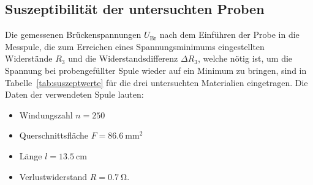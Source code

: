 \subsection{Suszeptibilität der untersuchten Proben}
%
Die gemessenen Brückenspannungen $U_\text{Br}$ nach dem Einführen der
Probe in die Messpule, die zum Erreichen eines Spannungsminimums
eingestellten Widerstände $R_3$ und die Widerstandsdifferenz $\Delta
R_3$, welche nötig ist, um die Spannung bei probengefüllter Spule wieder
auf ein Minimum zu bringen, sind in Tabelle~\ref{tab:suszeptwerte} für
die drei untersuchten Materialien eingetragen.  Die Daten der
verwendeten Spule lauten:
%
\begin{itemize}
\item Windungszahl $n = 250$
\item Querschnittsfläche $F = \SI{86.6}{\milli\metre^2}$
\item Länge $l = \SI{13.5}{\centi\metre}$
\item Verlustwiderstand $R = \SI{0.7}{\ohm}$.
\end{itemize}

